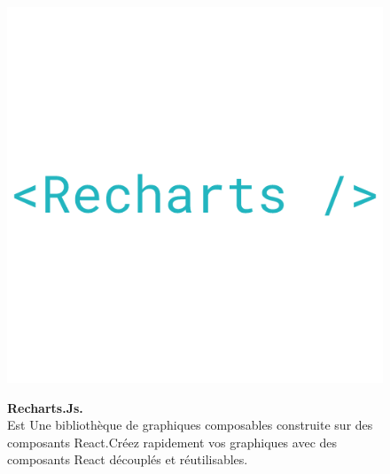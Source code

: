 \vspace{0.5cm}

\begin{figure}[H]
    \centering
    \begin{minipage}[c]{0.3\textwidth}
        \includegraphics[width=\linewidth]{projet/images/diagramme de sequance/images/recharts.png}
    \end{minipage}
    \hspace{1cm}
    \begin{minipage}[c]{0.6\textwidth}
        \textbf{Recharts.Js.}\\[0.5em]
    Est Une bibliothèque de graphiques composables construite sur des composants React.Créez rapidement vos graphiques avec des composants React découplés et réutilisables. \cite{ref17}
    \end{minipage}
\end{figure}
\vspace{0.5cm}

